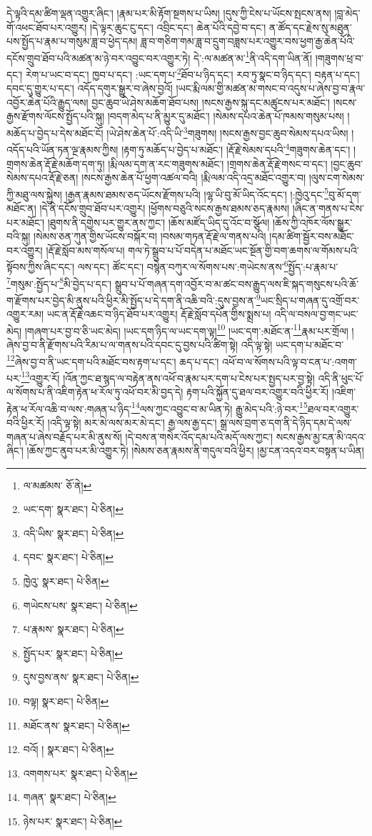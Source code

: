 དེ་ལྟའི་དམ་ཚིག་ལྡན་འགྱུར་ཞིང་། །རྣམ་པར་མི་རྟོག་སྔགས་པ་ཡིས། །དུས་ཀྱི་ངེས་པ་ཡོངས་སྤངས་ནས། །བླ་མེད་གོ་འཕང་ཐོབ་པར་འགྱུར། །དེ་ལྟར་ཆུང་ངུ་དང་། འབྲིང་དང་། ཆེན་པོའི་དབྱེ་བ་དང་། ན་ཚོད་དང་རྗེས་སུ་མཐུན་པས་སྤྱོད་པ་རྣམ་པ་གསུམ་ཟླ་བ་ཕྱེད་དམ། ཟླ་བ་གཅིག་གམ་ཟླ་བ་དྲུག་བཟླས་པར་འགྱུར་བས་ཕྱག་རྒྱ་ཆེན་པོའི་དངོས་གྲུབ་ཐོབ་པའི་མཚན་མ་ཉེ་བར་འབྱུང་བར་འགྱུར་ཏེ། དེ་:ལ་མཚན་མ་\footnote{ལ་མཚམས་  ཅོ་ནེ། }ནི་འདི་དག་ཡིན་ནོ། །གཟུགས་ཕྲ་བ་དང་། རེག་པ་ཡང་བ་དང་། ཁྱབ་པ་དང་། :ཡང་དག་པ་\footnote{ཡང་དག་  སྣར་ཐང་།  པེ་ཅིན། }ཐོབ་པ་ཉིད་དང་། རབ་ཏུ་སྣང་བ་ཉིད་དང་། བརྟན་པ་དང་། དབང་དུ་གྱུར་པ་དང་། འདོད་དགུར་སྒྱུར་བ་ཞེས་བྱའོ། །ཡང་རྨི་ལམ་གྱི་མཚན་མ་གསང་བ་འདུས་པ་ཞེས་བྱ་བ་རྣལ་འབྱོར་ཆེན་པོའི་རྒྱུད་ལས། བྱང་ཆུབ་ཡེ་ཤེས་མཆོག་ཐོབ་པས། །སངས་རྒྱས་སྐུ་དང་མཚུངས་པར་མཐོང་། །སངས་རྒྱས་རྫོགས་ལོངས་སྤྱོད་པའི་སྐུ། །བདག་མེད་པ་ནི་མྱུར་དུ་མཐོང་། །སེམས་དཔའ་ཆེན་པོ་ཁམས་གསུམ་པས། །མཆོད་པ་བྱེད་པ་དེས་མཐོང་ངོ། །ཡེ་ཤེས་ཆེན་པོ་:འདི་ཡི་\footnote{འདི་ཡིས་  སྣར་ཐང་།  པེ་ཅིན། }གཟུགས། །སངས་རྒྱས་བྱང་ཆུབ་སེམས་དཔའ་ཡིས། །འདོད་པའི་ཡོན་ཏན་ལྔ་རྣམས་ཀྱིས། །རྟག་ཏུ་མཆོད་པ་བྱེད་པ་མཐོང་། །རྡོ་རྗེ་སེམས་དཔའི་\footnote{དབང་  སྣར་ཐང་།  པེ་ཅིན། }གཟུགས་ཆེན་དང་། །གྲགས་ཆེན་རྡོ་རྗེ་མཆོག་དག་ཏུ། །རྨི་ལམ་དག་ན་རང་གཟུགས་མཐོང་། །གྲགས་ཆེན་རྡོ་རྗེ་གསང་བ་དང་། །བྱང་ཆུབ་སེམས་དཔའ་རྡོ་རྗེ་ཅན། །སངས་རྒྱས་ཆེན་པོ་ཕྱག་འཚལ་བའི། །རྨི་ལམ་འདི་འདྲ་མཐོང་འགྱུར་བ། །ལུས་ངག་སེམས་ཀྱི་མཐུ་ལས་སྐྱེས། །རྒྱན་རྣམས་ཐམས་ཅད་ཡོངས་རྫོགས་པའི། །ལྷ་ཡི་བུ་མོ་ཡིད་འོང་དང་། །:ཁྱེའུ་དང་\footnote{ཁྱེའུ་  སྣར་ཐང་།  པེ་ཅིན། }བུ་མོ་དག་མཐོང་ན། །དེ་ནི་དངོས་གྲུབ་ཐོབ་པར་འགྱུར། །ཕྱོགས་བཅུའི་སངས་རྒྱས་ཐམས་ཅད་རྣམས། །ཞིང་ན་གནས་པ་ངེས་པར་མཐོང་། །ཐུགས་ནི་དགྱེས་པར་གྱུར་ནས་ཀྱང་། །ཆོས་མཛོད་ཡིད་དུ་འོང་བ་སྩོལ། །ཆོས་ཀྱི་འཁོར་ལོས་སྒྱུར་བའི་སྐུ། །སེམས་ཅན་ཀུན་གྱིས་ཡོངས་བསྐོར་བ། །བསམ་གཏན་རྡོ་རྗེ་ལ་གནས་པའི། །དམ་ཚིག་སྦྱོར་བས་མཐོང་བར་འགྱུར། །རྡོ་རྗེ་སློབ་མས་གསོལ་པ། གལ་ཏེ་སྒྲུབ་པ་པོ་བདེན་པ་མཐོང་ཡང་སྔོན་གྱི་བག་ཆགས་ལ་གོམས་པའི་སྟོབས་ཀྱིས་ཞིང་དང་། ལས་དང་། ཚོང་དང་། བསྙེན་བཀུར་ལ་སོགས་པས་:གཡེངས་ནས་\footnote{གཡེངས་པས་  སྣར་ཐང་།  པེ་ཅིན། }སྤྱོད་:པ་རྣམ་པ་\footnote{པ་རྣམས་  སྣར་ཐང་།  པེ་ཅིན། }གསུམ་:སྤྱོད་པ་\footnote{སྤྱོད་པར་  སྣར་ཐང་།  པེ་ཅིན། }མི་བྱེད་པ་དང་། སྒྲུབ་པ་པོ་གཞན་དག་འབྱོར་བ་མ་ཚང་བས་རྒྱུད་ལས་ཇི་སྐད་གསུངས་པའི་ཆོ་ག་རྫོགས་པར་བྱེད་མི་ནུས་པའི་ཕྱིར་མི་སྤྱོད་པ་དེ་དག་ནི་འཆི་བའི་:དུས་བྱས་ན་\footnote{དུས་བྱས་ནས་  སྣར་ཐང་།  པེ་ཅིན། }ཡང་སྲིད་པ་གཞན་དུ་འགྲོ་བར་འགྱུར་རམ། ཡང་ན་རྡོ་རྗེ་འཆང་བ་ཉིད་ཐོབ་པར་འགྱུར། རྡོ་རྗེ་སློབ་དཔོན་གྱིས་སྨྲས་པ། འདི་ལ་བསལ་བྱ་གང་ཡང་མེད། །གཞག་པར་བྱ་བ་ཅི་ཡང་མེད། །ཡང་དག་ཉིད་ལ་ཡང་དག་ལྟ།\footnote{བལྟ།  སྣར་ཐང་།  པེ་ཅིན། } །ཡང་དག་:མཐོང་ན་\footnote{མཐོང་ནས་  སྣར་ཐང་།  པེ་ཅིན། }རྣམ་པར་གྲོལ། །ཞེས་བྱ་བ་ནི་རྫོགས་པའི་རིམ་པ་ལ་གནས་པའི་དབང་དུ་བྱས་པའི་ཚིག་སྟེ། འདི་ལྟ་སྟེ། ཡང་དག་པ་མཐོང་བ་\footnote{བའོ། །  སྣར་ཐང་།  པེ་ཅིན། }ཞེས་བྱ་བ་ནི་ཡང་དག་པའི་མཐོང་བས་རྟག་པ་དང་། ཆད་པ་དང་། འཕོ་བ་ལ་སོགས་པའི་ལྟ་བ་ངན་པ་:འགག་པར་\footnote{འགགས་པར་  སྣར་ཐང་།  པེ་ཅིན། }འགྱུར་རོ། །འོན་ཀྱང་ཐ་སྙད་ལ་བརྟེན་ནས་འཕོ་བ་རྣམ་པར་དག་པ་ངེས་པར་སྤྱད་པར་བྱ་སྟེ། འདི་ནི་ཕུང་པོ་ལ་སོགས་པ་ནི་འཇིག་རྟེན་ཕ་རོལ་ཏུ་འཕོ་བར་མི་བྱད་དེ། རྟག་པའི་སྐྱོན་དུ་ཐལ་བར་འགྱུར་བའི་ཕྱིར་རོ། །འཇིག་རྟེན་ཕ་རོལ་འཆི་བ་ལས་:གཞན་པ་ཉིད་\footnote{གཞན་  སྣར་ཐང་།  པེ་ཅིན། }ལས་ཀྱང་འབྱུང་བ་མ་ཡིན་ཏེ། རྒྱུ་མེད་པའི་:ཉེ་བར་\footnote{ཉེས་པར་  སྣར་ཐང་།  པེ་ཅིན། }ཐལ་བར་འགྱུར་བའི་ཕྱིར་རོ། །འདི་ལྟ་སྟེ། མར་མེ་ལས་མར་མེ་དང་། རྒྱ་ལས་རྒྱ་དང་། སྒྲ་ལས་བྲག་ཅ་དག་ནི་དེ་ཉིད་དམ་དེ་ལས་གཞན་པ་ཞེས་བརྗོད་པར་མི་ནུས་སོ། །དེ་བས་ན་གསེར་འོད་དམ་པའི་མདོ་ལས་ཀྱང་། སངས་རྒྱས་མྱ་ངན་མི་འདའ་ཞིང་། །ཆོས་ཀྱང་ནུབ་པར་མི་འགྱུར་ཏེ། །སེམས་ཅན་རྣམས་ནི་གདུལ་བའི་ཕྱིར། །མྱ་ངན་འདའ་བར་བསྟན་པ་ཡིན། 